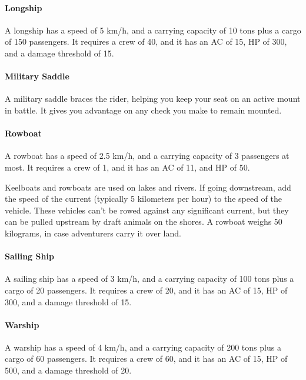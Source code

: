     \paragraph{Longship}
        A longship has a speed of 5 km/h, and a carrying capacity of 10 tons plus a cargo of 150 passengers.
        It requires a crew of 40, and it has an AC of 15, HP of 300, and a damage threshold of 15.
    \paragraph{Military Saddle}
        A military saddle braces the rider, helping you keep your seat on an active mount in battle.
        It gives you advantage on any check you make to remain mounted.
    \paragraph{Rowboat}
        A rowboat has a speed of 2.5 km/h, and a carrying capacity of 3 passengers at most.
        It requires a crew of 1, and it has an AC of 11, and HP of 50.

        Keelboats and rowboats are used on lakes and rivers.
        If going downstream, add the speed of the current (typically 5 kilometers per hour) to the speed of the vehicle.
        These vehicles can't be rowed against any significant current, but they can be pulled upstream by draft animals on the shores.
        A rowboat weighs 50 kilograms, in case adventurers carry it over land.
    \paragraph{Sailing Ship}
        A sailing ship has a speed of 3 km/h, and a carrying capacity of 100 tons plus a cargo of 20 passengers.
        It requires a crew of 20, and it has an AC of 15, HP of 300, and a damage threshold of 15.
    \paragraph{Warship}
        A warship has a speed of 4 km/h, and a carrying capacity of 200 tons plus a cargo of 60 passengers.
        It requires a crew of 60, and it has an AC of 15, HP of 500, and a damage threshold of 20.
\newpage
